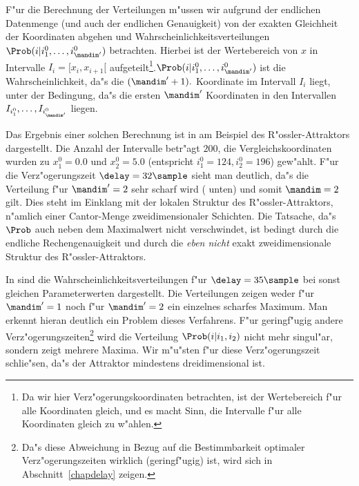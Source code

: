 F"ur die Berechnung der Verteilungen m"ussen wir aufgrund der endlichen Datenmenge (und
auch der endlichen Genauigkeit) von der exakten Gleichheit der Koordinaten abgehen und
Wahrscheinlichkeitsverteilungen $\Prob(i\vert i^0_1,\dots,i^0_{\mandim'})$ betrachten.
Hierbei ist der Wertebereich von $x$ in Intervalle $I_i=[x_i,x_{i+1}[$
aufgeteilt\footnote{Da wir hier Verz"ogerungskoordinaten betrachten, ist der Wertebereich
  f"ur alle Koordinaten gleich, und es macht Sinn, die Intervalle f"ur alle Koordinaten
  gleich zu w"ahlen.}.\@ $\Prob(i\vert i^0_1,\dots,i^0_{\mandim'})$ ist die
Wahrscheinlichkeit, da"s die $(\mandim'+1).$ Koordinate im Intervall $I_i$ liegt, unter der
Bedingung, da"s die ersten $\mandim'$ Koordinaten in den Intervallen
$I_{i^0_1},\dots,I_{i^0_{\mandim'}}$ liegen.



Das Ergebnis einer solchen Berechnung ist in  am Beispiel des
R"ossler-Attraktors dargestellt. Die Anzahl der Intervalle betr"agt $200$, die
Vergleichskoordinaten wurden zu $x^0_1=0.0$ und $x^0_2=5.0$ (entspricht $i^0_1=124,
i^0_2=196$) gew"ahlt. F"ur die Verz"ogerungszeit $\delay=32\sample$ 
sieht man deutlich, da"s die Verteilung f"ur $\mandim'=2$ sehr scharf wird (
unten) und somit $\mandim=2$ gilt. Dies steht im
Einklang mit der lokalen Struktur des R"ossler-Attraktors, n"amlich einer Cantor-Menge
zweidimensionaler Schichten. Die Tatsache, da"s $\Prob$ auch neben dem Maximalwert nicht
verschwindet, ist  bedingt durch die endliche Rechengenauigkeit und durch
die \emph{eben nicht} exakt zweidimensionale Struktur des R"ossler-Attraktors.

In  sind die Wahrscheinlichkeitsverteilungen f"ur
$\delay=35\sample$ bei sonst gleichen Parameterwerten dargestellt. Die Verteilungen zeigen 
weder f"ur $\mandim'=1$ noch f"ur $\mandim'=2$ ein einzelnes scharfes Maximum. Man erkennt
hieran deutlich ein
Problem dieses Verfahrens. F"ur geringf"ugig andere Verz"ogerungszeiten\footnote{Da"s diese Abweichung in Bezug auf
  die Bestimmbarkeit optimaler Verz"ogerungszeiten wirklich \begriff(geringf"ugig) ist,
  wird sich in Abschnitt~\ref{chapdelay} zeigen.} wird die
Verteilung $\Prob(i\vert i_1,i_2)$ nicht mehr singul"ar, sondern zeigt mehrere Maxima. Wir
m"u"sten f"ur diese Verz"ogerungszeit schlie"sen, da"s der Attraktor mindestens
dreidimensional ist.

